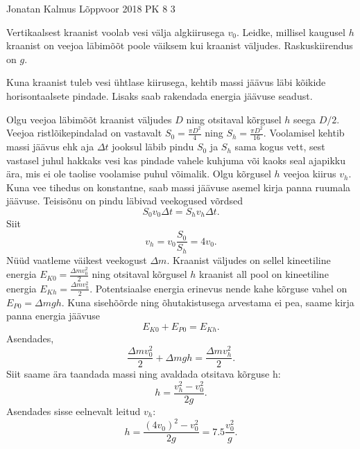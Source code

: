 {Jonatan Kalmus} %
{Lõppvoor} %
{2018} %
{PK 8} %
{3} %
{
\ifStatement
Vertikaalsest kraanist voolab vesi välja algkiirusega $v_0$. Leidke, millisel kaugusel $h$ kraanist on veejoa läbimõõt poole väiksem kui kraanist väljudes. Raskuskiirendus on $g$.
\fi


\ifHint
Kuna kraanist tuleb vesi ühtlase kiirusega, kehtib massi jäävus läbi kõikide horisontaalsete pindade. Lisaks saab rakendada energia jäävuse seadust.
\fi


\ifSolution
Olgu veejoa läbimõõt kraanist väljudes $D$ ning otsitaval kõrgusel $h$ seega $D/2$. Veejoa ristlõikepindalad on vastavalt $S_0 = \frac{\pi D^2}{4}$ ning $S_h = \frac{\pi D^2}{16}$. Voolamisel kehtib massi jäävus ehk aja $\Delta t$ jooksul läbib pindu $S_0$ ja $S_h$ sama kogus vett, sest vastasel juhul hakkaks vesi kas pindade vahele kuhjuma või kaoks seal ajapikku ära, mis ei ole taolise voolamise puhul võimalik. Olgu kõrgusel $h$ veejoa kiirus $v_h$. Kuna vee tihedus on konstantne, saab massi jäävuse asemel kirja panna ruumala jäävuse. Teisisõnu on pindu läbivad veekogused võrdsed \[S_0 v_0 \Delta t = S_h v_h \Delta t.\]
Siit 
\[v_h = v_0 \frac{S_0}{S_h} = 4 v_0.\]
Nüüd vaatleme väikest veekogust $\Delta m$. Kraanist väljudes on sellel kineetiline energia $E_{K0} = \frac{\Delta m v_0^2}{2}$ ning otsitaval kõrgusel $h$ kraanist all pool on kineetiline energia $E_{Kh} = \frac{\Delta m v_h^2}{2}$. Potentsiaalse energia erinevus nende kahe kõrguse vahel on $E_{P0} = \Delta mgh$. Kuna sisehõõrde ning õhutakistusega arvestama ei pea, saame kirja panna energia jäävuse
\[E_{K0} + E_{P0} = E_{Kh}.\]
Asendades,
\[\frac{\Delta m v_0^2}{2} + \Delta mgh = \frac{\Delta m v_h^2}{2}.\]
Siit saame ära taandada massi ning avaldada otsitava kõrguse h:
\[h = \frac{v_h^2 - v_0^2}{2g}.\]
Asendades sisse eelnevalt leitud $v_h$:
\[h = \frac{(4v_0)^2 - v_0^2}{2g} = \num{7.5} \frac{v_0^2}{g}.\]
\fi
}